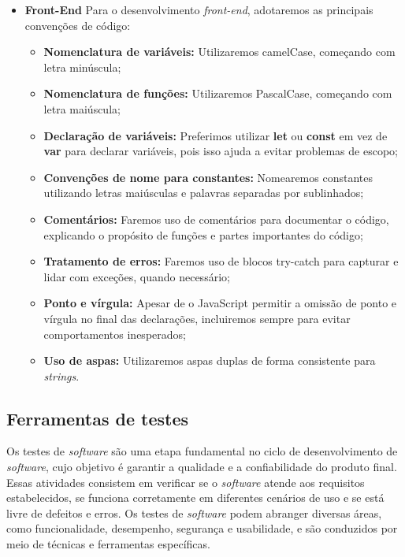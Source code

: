 \begin{itemize}
    \item \textbf{Front-End}
     Para o desenvolvimento \textit{front-end}, adotaremos as principais convenções de código:
     \begin{itemize}
        \item \textbf{Nomenclatura de variáveis:}
        Utilizaremos camelCase, começando com letra minúscula;
        \item \textbf{Nomenclatura de funções:}
        Utilizaremos PascalCase, começando com letra maiúscula;
        \item \textbf{Declaração de variáveis:}
        Preferimos utilizar \textbf{let} ou \textbf{const} em vez de \textbf{var} para declarar variáveis, pois isso ajuda a evitar problemas de escopo;
        \item \textbf{Convenções de nome para constantes:}
        Nomearemos constantes utilizando letras maiúsculas e palavras separadas por sublinhados;
        \item \textbf{Comentários:}
        Faremos uso de comentários para documentar o código, explicando o propósito de funções e partes importantes do código;
        \item \textbf{Tratamento de erros:}
        Faremos uso de blocos try-catch para capturar e lidar com exceções, quando necessário;
        \item \textbf{Ponto e vírgula:}
         Apesar de o JavaScript permitir a omissão de ponto e vírgula no final das declarações, incluiremos sempre para evitar comportamentos inesperados;
        \item \textbf{Uso de aspas:}
        Utilizaremos aspas duplas de forma consistente para \textit{strings}.
 
     \end{itemize}
\end{itemize}
\subsection{Ferramentas de testes}

Os testes de \textit{software} são uma etapa fundamental no ciclo de desenvolvimento de \textit{software}, cujo objetivo é garantir a qualidade e a confiabilidade do produto final. Essas atividades consistem em verificar se o \textit{software} atende aos requisitos estabelecidos, se funciona corretamente em diferentes cenários de uso e se está livre de defeitos e erros. Os testes de \textit{software} podem abranger diversas áreas, como funcionalidade, desempenho, segurança e usabilidade, e são conduzidos por meio de técnicas e ferramentas específicas. 

